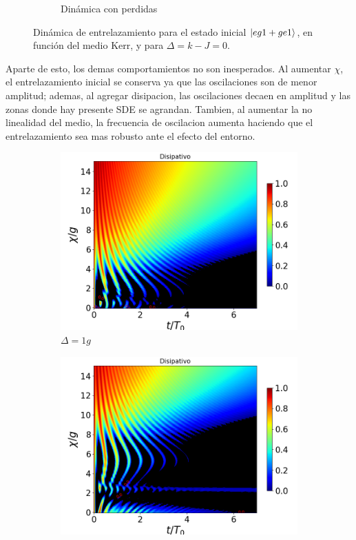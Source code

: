 \begin{figure}[h!]
\begin{subfigure}{0.49\textwidth}
        \caption{Dinámica con perdidas}
        \label{fig4:concu x 1 dis}
    \end{subfigure}
    \caption{Dinámica de entrelazamiento para el estado inicial $\ket{eg1+ge1}$, en función del medio Kerr, y para $\Delta=k-J=0$.}
    \label{fig4:concu x 1}
\end{figure}
Aparte de esto, los demas comportamientos no son inesperados. Al aumentar $\chi$, el entrelazamiento inicial se conserva ya que las oscilaciones son de menor amplitud; ademas, al agregar disipacion, las oscilaciones decaen en amplitud y las zonas donde hay presente SDE se agrandan. Tambien, al aumentar la no linealidad del medio, la frecuencia de oscilacion aumenta haciendo que el entrelazamiento sea mas robusto ante el efecto del entorno.
\begin{figure}[h!]
    \centering
    \begin{subfigure}{0.49\textwidth}
        \includegraphics[width=\textwidth]{figuras/ch4/concu/chi/eg1+ge1 d=1.0g k=0.0g J=0.0g gamma=0.25g concu chi dis.png}
        \caption{$\Delta=1g$}
        \label{fig4:concu x 1 d1}
    \end{subfigure}
    \hfill
    \begin{subfigure}{0.49\textwidth}
        \includegraphics[width=\textwidth]{figuras/ch4/concu/chi/eg1+ge1 d=5.0g k=0.0g J=0.0g gamma=0.25g concu chi dis.png}

\end{subfigure}
\end{figure}
